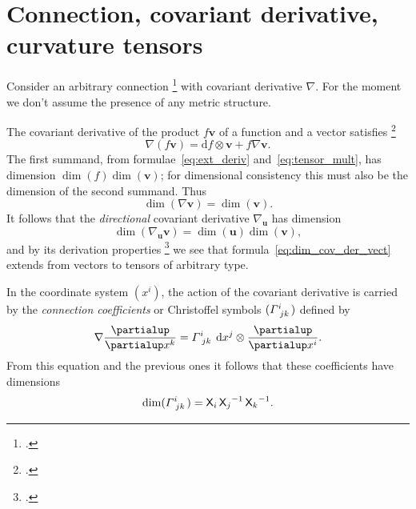 \documentclass[\ifafour a4paper,12pt,\else a5paper,10pt,\fi%
onecolumn,oneside,article,%
british%
]{memoir}
\theoremstyle{remark}
\theoremstyle{innote}
\newcommand*{\citep}{\footcites}
\newcommand*{\de}{\partialup}%
\newcommand*{\di}{\mathrm{d}}%
\renewcommand*{\|}[1][]{\nonscript\,#1\vert\nonscript\;\mathopen{}}
\newcommand*{\sect}{\S}%
\newcommand*{\Xx}{\textsf{X}}
\newcommand*{\yv}{\bm{v}}
\newcommand*{\yu}{\bm{u}}
\renewcommand*{\i}{\indices}
\newcommand*{\dex}[1][i]{\frac{\de}{\de x^{#1}}}
\newcommand*{\dix}[1][i]{\di x^{#1}}
\newcommand*{\nab}{\nabla}
\newcommand*{\yGa}{\varGamma}
\begin{document}
\section{Connection, covariant derivative, curvature tensors}
\label{sec:connection}

Consider an arbitrary connection
\citep[\sect~V.B]{choquetbruhatetal1977_r1996} with covariant derivative
$\nab$. For the moment we don't assume the presence of any metric
structure.

The covariant derivative of the product $f\yv$ of a function and a vector
satisfies \citep[\sect~V.B.1]{choquetbruhatetal1977_r1996}
\begin{equation}
  \label{eq:basic_property_covder}
  \nab(f\yv) = \di f \otimes \yv + f\nab\yv.
\end{equation}
The first summand, from formulae~\eqref{eq:ext_deriv}
and~\eqref{eq:tensor_mult}, has dimension $\dim(f)\dim(\yv)$; for
dimensional consistency this must also be the dimension of the second
summand. Thus
\begin{equation}
  \label{eq:dim_cov_der_vect}
  \dim(\nab\yv) = \dim(\yv).
\end{equation}
It follows that the \emph{directional} covariant derivative $\nab_{\yu}$
has dimension
\begin{equation}
  \label{eq:dim_dircov_der_vect}
  \dim(\nab_{\yu}\yv) = \dim(\yu)\dim(\yv),
\end{equation}
and by its derivation properties \citep[\sect~V.B.1
p.~303]{choquetbruhatetal1977_r1996} we see that
formula~\eqref{eq:dim_cov_der_vect} extends from vectors to 
tensors of arbitrary type.

\medskip

In the coordinate system $(x^{i})$, the action of the covariant derivative
is carried by the \emph{connection coefficients} or Christoffel symbols
$(\yGa\i{^{i}_{jk}})$ defined by
\begin{equation}
  \label{eq:christoffel}
  \nab\dex[k] = \yGa\i{^{i}_{jk}}\; \dix[j]\otimes\dex[i].
\end{equation}
From this equation and the previous ones it follows that these coefficients
have dimensions
\begin{equation}
  \label{eq:dim_christoffel}
  \dim(\yGa\i{^{i}_{jk}}) = \Xx_{i}\, {\Xx_{j}}^{-1}\,{\Xx_{k}}^{-1}.
\end{equation}

\medskip
\end{document}
